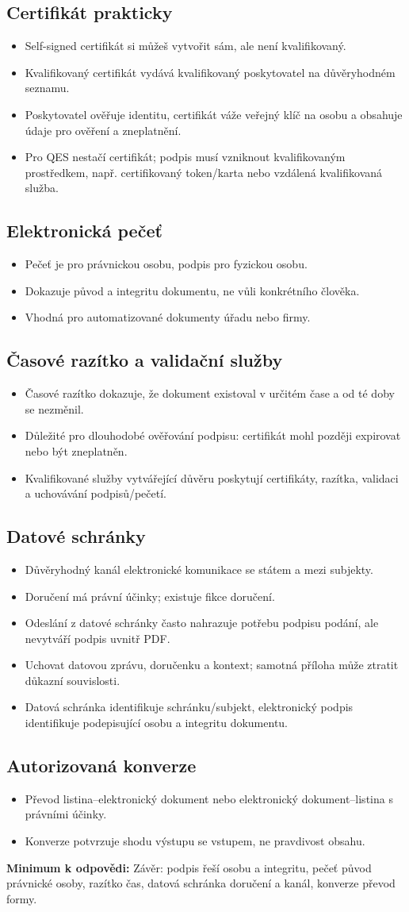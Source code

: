 \documentclass[10pt,a4paper]{article}
\newcommand{\must}[1]{\colorbox{blue!7}{\parbox{\dimexpr\linewidth-2\fboxsep}{\textbf{Minimum k odpovědi:} #1}}\par\medskip}
\newcommand{\blok}[1]{\subsection*{#1}}
\begin{document}
\blok{Certifikát prakticky}
\begin{itemize}
  \item Self-signed certifikát si můžeš vytvořit sám, ale není kvalifikovaný.
  \item Kvalifikovaný certifikát vydává kvalifikovaný poskytovatel na důvěryhodném seznamu.
  \item Poskytovatel ověřuje identitu, certifikát váže veřejný klíč na osobu a obsahuje údaje pro ověření a zneplatnění.
  \item Pro QES nestačí certifikát; podpis musí vzniknout kvalifikovaným prostředkem, např. certifikovaný token/karta nebo vzdálená kvalifikovaná služba.
\end{itemize}

\blok{Elektronická pečeť}
\begin{itemize}
  \item Pečeť je pro právnickou osobu, podpis pro fyzickou osobu.
  \item Dokazuje původ a integritu dokumentu, ne vůli konkrétního člověka.
  \item Vhodná pro automatizované dokumenty úřadu nebo firmy.
\end{itemize}

\blok{Časové razítko a validační služby}
\begin{itemize}
  \item Časové razítko dokazuje, že dokument existoval v určitém čase a od té doby se nezměnil.
  \item Důležité pro dlouhodobé ověřování podpisu: certifikát mohl později expirovat nebo být zneplatněn.
  \item Kvalifikované služby vytvářející důvěru poskytují certifikáty, razítka, validaci a uchovávání podpisů/pečetí.
\end{itemize}

\blok{Datové schránky}
\begin{itemize}
  \item Důvěryhodný kanál elektronické komunikace se státem a mezi subjekty.
  \item Doručení má právní účinky; existuje fikce doručení.
  \item Odeslání z datové schránky často nahrazuje potřebu podpisu podání, ale nevytváří podpis uvnitř PDF.
  \item Uchovat datovou zprávu, doručenku a kontext; samotná příloha může ztratit důkazní souvislosti.
  \item Datová schránka identifikuje schránku/subjekt, elektronický podpis identifikuje podepisující osobu a integritu dokumentu.
\end{itemize}

\blok{Autorizovaná konverze}
\begin{itemize}
  \item Převod listina--elektronický dokument nebo elektronický dokument--listina s právními účinky.
  \item Konverze potvrzuje shodu výstupu se vstupem, ne pravdivost obsahu.
\end{itemize}

\must{Závěr: podpis řeší osobu a integritu, pečeť původ právnické osoby, razítko čas, datová schránka doručení a kanál, konverze převod formy.}
\end{document}
